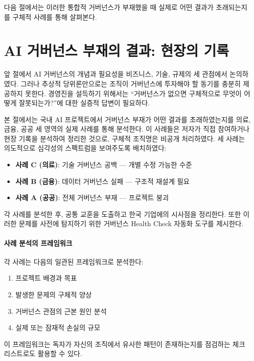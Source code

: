 다음 절에서는 이러한 통합적 거버넌스가 부재했을 때 실제로 어떤 결과가 초래되는지를 구체적 사례를 통해 살펴본다.

\section{AI 거버넌스 부재의 결과: 현장의 기록}
\label{sec:1.3}

앞 절에서 AI 거버넌스의 개념과 필요성을 비즈니스, 기술, 규제의 세 관점에서 논의하였다. 그러나 추상적 당위론만으로는 조직이 거버넌스에 투자해야 할 동기를 충분히 제공하지 못한다. 경영진을 설득하기 위해서는 ``거버넌스가 없으면 구체적으로 무엇이 어떻게 잘못되는가?''에 대한 실증적 답변이 필요하다.\cite{raji2020closing}

본 절에서는 국내 AI 프로젝트에서 거버넌스 부재가 어떤 결과를 초래하였는지를 의료, 금융, 공공 세 영역의 실제 사례를 통해 분석한다. 이 사례들은 저자가 직접 참여하거나 현장 기록을 분석하여 정리한 것으로, 구체적 조직명은 비공개 처리하였다. 세 사례는 의도적으로 심각성의 스펙트럼을 보여주도록 배치하였다:

\begin{itemize}
    \item \textbf{사례 C (의료)}: 기술 거버넌스 공백 --- 개별 수정 가능한 수준
    \item \textbf{사례 B (금융)}: 데이터 거버넌스 실패 --- 구조적 재설계 필요
    \item \textbf{사례 A (공공)}: 전체 거버넌스 부재 --- 프로젝트 붕괴
\end{itemize}

각 사례를 분석한 후, 공통 교훈을 도출하고 한국 기업에의 시사점을 정리한다. 또한 이러한 문제를 사전에 탐지하기 위한 거버넌스 Health Check 자동화 도구를 제시한다.

\paragraph{사례 분석의 프레임워크}
각 사례는 다음의 일관된 프레임워크로 분석한다:
\begin{enumerate}
    \item 프로젝트 배경과 목표
    \item 발생한 문제의 구체적 양상
    \item 거버넌스 관점의 근본 원인 분석
    \item 실제 또는 잠재적 손실의 규모
\end{enumerate}
이 프레임워크는 독자가 자신의 조직에서 유사한 패턴이 존재하는지를 점검하는 체크리스트로도 활용할 수 있다.

